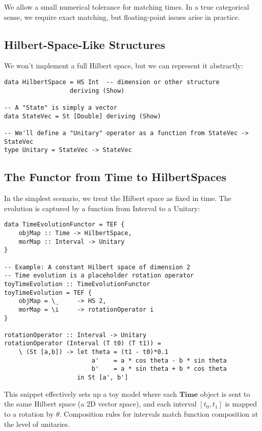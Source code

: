 \documentclass[12pt]{article}
\begin{document}
We allow a small numerical tolerance for matching times. In a true categorical sense, we require exact matching, but floating-point issues arise in practice.

\subsection{Hilbert-Space-Like Structures}
We won't implement a full Hilbert space, but we can represent it abstractly:

\begin{lstlisting}[caption={Abstract HilbertSpace and State Types}]
data HilbertSpace = HS Int  -- dimension or other structure
                  deriving (Show)

-- A "State" is simply a vector
data StateVec = St [Double] deriving (Show)

-- We'll define a "Unitary" operator as a function from StateVec -> StateVec
type Unitary = StateVec -> StateVec
\end{lstlisting}

\subsection{The Functor from Time to HilbertSpaces}
In the simplest scenario, we treat the Hilbert space as fixed in time. The evolution is captured by a function from Interval to a Unitary:

\begin{lstlisting}[caption={Functor for TimeEvolution},label={lst:functorTimeEvolution}]
data TimeEvolutionFunctor = TEF {
    objMap :: Time -> HilbertSpace,
    morMap :: Interval -> Unitary
}

-- Example: A constant Hilbert space of dimension 2
-- Time evolution is a placeholder rotation operator
toyTimeEvolution :: TimeEvolutionFunctor
toyTimeEvolution = TEF {
    objMap = \_     -> HS 2,
    morMap = \i     -> rotationOperator i
}

rotationOperator :: Interval -> Unitary
rotationOperator (Interval (T t0) (T t1)) = 
    \ (St [a,b]) -> let theta = (t1 - t0)*0.1
                        a'    = a * cos theta - b * sin theta
                        b'    = a * sin theta + b * cos theta
                    in St [a', b']
\end{lstlisting}

This snippet effectively sets up a toy model where each \(\textbf{Time}\) object is sent to the same Hilbert space (a 2D vector space), and each interval \([t_0,t_1]\) is mapped to a rotation by \(\theta\). Composition rules for intervals match function composition at the level of unitaries.
\end{document}
